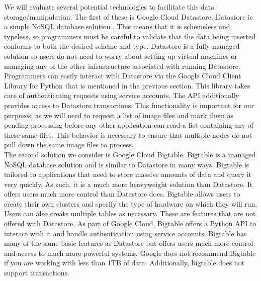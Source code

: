 \documentclass[10pt, onecolumn, draftclsnofoot, letterpaper, compsoc]{IEEEtran}
\begin{document}
We will evaluate several potential technologies to facilitate this data 
storage/manipulation. The first of these is Google Cloud Datastore. Datastore 
is a simple NoSQL database solution \cite{cloudDatastore}. This means that it is 
schemeless and typeless, so programmers must be careful to validate that the 
data being inserted conforms to both the desired scheme and type. 
Datastore is a fully managed solution so users do not need to worry about setting 
up virtual machines or managing any of the other infrastructure associated with 
running Datastore\cite{cloudDatastore}. Programmers can easily interact with Datastore 
via the Google Cloud Client Library for Python that is mentioned in the previous 
section\cite{cloudDatastoreDocs}. This library takes care of authenticating requests 
using service accounts\cite{cloudDatastoreDocs}. The API additionally provides access 
to Datastore transactions\cite{cloudDatastoreDocs}. This functionality is important for 
our purposes, as we will need to request a list of image files and mark them as pending 
processing before any other application can read a list containing any of these same files. 
This behavior is necessary to ensure that multiple nodes do not pull down the same image 
files to process. \\

The second solution we consider is Google Cloud Bigtable. Bigtable is a managed NoSQL 
database solution and is similar to Datastore in many ways\cite{cloudBigtable}. 
Bigtable is tailored to applications that need to store massive amounts of data 
and query it very quickly\cite{cloudBigtable}. As such, it is a much more heavyweight 
solution than Datastore. It offers users much more control than Datastore does. 
Bigtable allows users to create their own clusters and specify the type of hardware on 
which they will run\cite{cloudBigtableDocs}. Users can also create multiple tables 
as necessary\cite{cloudBigtableDocs}. These are features that are not offered with 
Datastore. As part of Google Cloud, Bigtable offers a Python API to interact with it 
and handle authentication using service accounts\cite{cloudBigtableDocs}. Bigtable has 
many of the same basic features as Datastore but offers users much more control 
and access to much more powerful systems. Google does not recommend Bigtable if 
you are working with less than 1TB of data\cite{cloudBigtable}. Additionally, 
bigtable does not support transactions\cite{cloudBigtable}. \\
\end{document}
